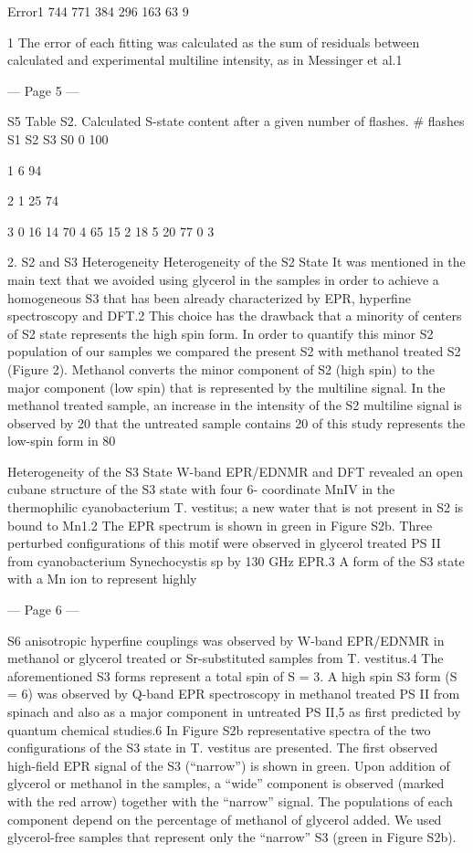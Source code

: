Error1 
744 
771 
384 
296 
163 
63 
9 
 
 
1 The error of each fitting was calculated as the sum of residuals between calculated and experimental multiline intensity, as in Messinger et al.1 


--- Page 5 ---
 
S5 
Table S2. Calculated S-state content after a given number of flashes. 
# flashes 
S1 
S2 
S3 
S0 
0 
100 
 
 
 
1 
6 
94 
 
 
2 
1 
25 
74 
 
3 
0 
16 
14 
70 
4 
65 
15 
2 
18 
5 
20 
77 
0 
3 
 
 
2. S2 and S3 Heterogeneity 
Heterogeneity of the S2 State 
It was mentioned in the main text that we avoided using glycerol in the samples in order to achieve 
a homogeneous S3 that has been already characterized by EPR, hyperfine spectroscopy and DFT.2 
This choice has the drawback that a minority of centers of S2 state represents the high spin form. 
In order to quantify this minor S2 population of our samples we compared the present S2 with 
methanol treated S2 (Figure 2). Methanol converts the minor component of S2 (high spin) to the 
major component (low spin) that is represented by the multiline signal. In the methanol treated 
sample, an increase in the intensity of the S2 multiline signal is observed by 20%
that the untreated sample contains 20%
of this study represents the low-spin form in 80%
 
Heterogeneity of the S3 State 
W-band EPR/EDNMR and DFT revealed an open cubane structure of the S3 state with four 6-
coordinate MnIV in the thermophilic cyanobacterium T. vestitus; a new water that is not present in 
S2 is bound to Mn1.2 The EPR spectrum is shown in green in Figure S2b. Three perturbed 
configurations of this motif were observed in glycerol treated PS II from cyanobacterium 
Synechocystis sp by 130 GHz EPR.3 A form of the S3 state with a Mn ion to represent highly 


--- Page 6 ---
 
S6 
anisotropic hyperfine couplings was observed by W-band EPR/EDNMR in methanol or glycerol 
treated or Sr-substituted samples from T. vestitus.4 The aforementioned S3 forms represent a total 
spin of S = 3. A high spin S3 form (S = 6) was observed by Q-band EPR spectroscopy in methanol 
treated PS II from spinach and also as a major component in untreated PS II,5 as first predicted by 
quantum chemical studies.6  
In Figure S2b representative spectra of the two configurations of the S3 state in T. vestitus are 
presented. The first observed high-field EPR signal of the S3 (“narrow”) is shown in green. Upon 
addition of glycerol or methanol in the samples, a “wide” component is observed (marked with the 
red arrow) together with the “narrow” signal. The populations of each component depend on the 
percentage of methanol of glycerol added. We used glycerol-free samples that represent only the 
“narrow” S3 (green in Figure S2b).  
 
